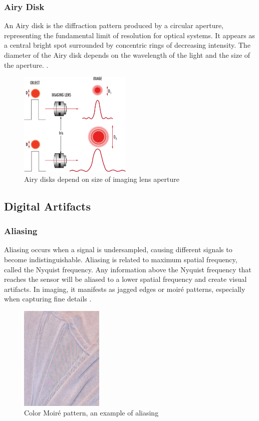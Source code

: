\subsubsection{Airy Disk}
An Airy disk is the diffraction pattern produced by a circular aperture, representing the fundamental limit of resolution for optical systems. It appears as a central bright spot surrounded by concentric rings of decreasing intensity. The diameter of the Airy disk depends on the wavelength of the light and the size of the aperture. \cite{AiryDisk}.

\begin{figure}[htbp]
\centering
\includegraphics[height=5cm]{Images/airy_disk.png}
\caption{Airy disks depend on size of imaging lens aperture \cite{AiryDisk}}
\label{fig:airy_disk}
\end{figure}

\subsection{Digital Artifacts}

\subsubsection{Aliasing}
Aliasing occurs when a signal is undersampled, causing different signals to become indistinguishable. Aliasing is related to maximum spatial frequency, called the Nyquist frequency. Any information above the Nyquist frequency that reaches the sensor will be aliased to a lower spatial frequency and create visual artifacts. In imaging, it manifests as jagged edges or moiré patterns, especially when capturing fine details \cite{Aliasing}.

\begin{figure}[htbp]
\centering
\includegraphics[height=5cm]{Images/color_moire.jpg}
\caption{Color Moiré pattern, an example of aliasing \cite{Aliasing}}
\label{fig:moire}
\end{figure}

